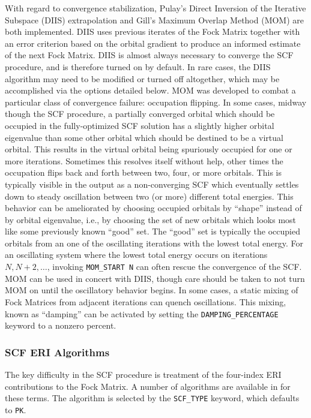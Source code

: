 With regard to convergence stabilization, Pulay's Direct Inversion of the
Iterative Subspace (DIIS) extrapolation and Gill's Maximum Overlap Method (MOM)
are both implemented. DIIS uses previous iterates of the Fock Matrix together
with an error criterion based on the orbital gradient to produce an informed
estimate of the next Fock Matrix. DIIS is almost always necessary to converge
the SCF procedure, and is therefore turned on by default. In rare cases, the
DIIS algorithm may need to be modified or turned off altogether, which may be
accomplished via the options detailed below. MOM was developed to combat a
particular class of convergence failure: occupation flipping. In some cases,
midway though the SCF procedure, a partially converged orbital which should be
occupied in the fully-optimized SCF solution has a slightly higher orbital
eigenvalue than some other orbital which should be destined to be a virtual
orbital. This results in the virtual orbital being spuriously occupied for one
or more iterations. Sometimes this resolves itself without help, other times the
occupation flips back and forth between two, four, or more orbitals. This is
typically visible in the output as a non-converging SCF which eventually settles
down to steady oscillation between two (or more) different total energies. This
behavior can be ameliorated by choosing occupied orbitals by ``shape'' instead
of by orbital eigenvalue, i.e., by choosing the set of new orbitals which looks
most like some previously known ``good'' set.  The ``good'' set is typically the
occupied orbitals from an one of the oscillating iterations with the lowest
total energy. For an oscillating system where the lowest total energy occurs on
iterations $N,N+2,\ldots$, invoking \texttt{MOM\_START N} can often rescue the
convergence of the SCF. MOM can be used in concert with DIIS, though care should
be taken to not turn MOM on until the oscillatory behavior begins. In some
cases, a static mixing of Fock Matrices from adjacent iterations can quench
oscillations. This mixing, known as ``damping'' can be activated by setting the
\texttt{DAMPING\_PERCENTAGE} keyword to a nonzero percent. 

\subsubsection{SCF ERI Algorithms}

The key difficulty in the SCF procedure is treatment of the four-index ERI
contributions to the Fock Matrix. A number of algorithms are available in
\PSIfour for these terms. The algorithm is selected by the \texttt{SCF\_TYPE}
keyword, which defaults to \texttt{PK}. 

